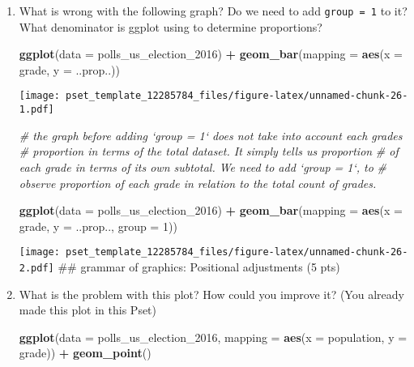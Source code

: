 \documentclass[
]{article}
\newenvironment{Shaded}{\begin{snugshade}}{\end{snugshade}}
\newcommand{\CommentTok}[1]{\textcolor[rgb]{0.56,0.35,0.01}{\textit{#1}}}
\newcommand{\DataTypeTok}[1]{\textcolor[rgb]{0.13,0.29,0.53}{#1}}
\newcommand{\DecValTok}[1]{\textcolor[rgb]{0.00,0.00,0.81}{#1}}
\newcommand{\KeywordTok}[1]{\textcolor[rgb]{0.13,0.29,0.53}{\textbf{#1}}}
\newcommand{\NormalTok}[1]{#1}
\newcommand{\OperatorTok}[1]{\textcolor[rgb]{0.81,0.36,0.00}{\textbf{#1}}}
\newcommand{\StringTok}[1]{\textcolor[rgb]{0.31,0.60,0.02}{#1}}
\begin{document}
\begin{enumerate}
\def\labelenumi{\arabic{enumi}.}
\item
  What is wrong with the following graph? Do we need to add
  \texttt{group\ =\ 1} to it? What denominator is ggplot using to
  determine proportions?

\begin{Shaded}
\begin{Highlighting}[]
\KeywordTok{ggplot}\NormalTok{(}\DataTypeTok{data =}\NormalTok{ polls_us_election_}\DecValTok{2016}\NormalTok{) }\OperatorTok{+}\StringTok{ }
\StringTok{  }\KeywordTok{geom_bar}\NormalTok{(}\DataTypeTok{mapping =} \KeywordTok{aes}\NormalTok{(}\DataTypeTok{x =}\NormalTok{ grade, }\DataTypeTok{y =}\NormalTok{ ..prop..))}
\end{Highlighting}
\end{Shaded}

  \texttt{[image: pset\_template\_12285784\_files/figure-latex/unnamed-chunk-26-1.pdf]}

\begin{Shaded}
\begin{Highlighting}[]
\CommentTok{# the graph before adding `group = 1` does not take into account each grades}
\CommentTok{# proportion in terms of the total dataset. It simply tells us proportion}
\CommentTok{# of each grade in terms of its own subtotal. We need to add `group = 1`, to}
\CommentTok{# observe proportion of each grade in relation to the total count of grades.}

\KeywordTok{ggplot}\NormalTok{(}\DataTypeTok{data =}\NormalTok{ polls_us_election_}\DecValTok{2016}\NormalTok{) }\OperatorTok{+}\StringTok{ }
\StringTok{  }\KeywordTok{geom_bar}\NormalTok{(}\DataTypeTok{mapping =} \KeywordTok{aes}\NormalTok{(}\DataTypeTok{x =}\NormalTok{ grade, }\DataTypeTok{y =}\NormalTok{ ..prop.., }\DataTypeTok{group =} \DecValTok{1}\NormalTok{))}
\end{Highlighting}
\end{Shaded}

  \texttt{[image: pset\_template\_12285784\_files/figure-latex/unnamed-chunk-26-2.pdf]}
  \#\# grammar of graphics: Positional adjustments (5 pts)
\item
  What is the problem with this plot? How could you improve it? (You
  already made this plot in this Pset)

\begin{Shaded}
\begin{Highlighting}[]
\KeywordTok{ggplot}\NormalTok{(}\DataTypeTok{data =}\NormalTok{ polls_us_election_}\DecValTok{2016}\NormalTok{, }
       \DataTypeTok{mapping =} \KeywordTok{aes}\NormalTok{(}\DataTypeTok{x =}\NormalTok{ population, }\DataTypeTok{y =}\NormalTok{ grade)) }\OperatorTok{+}\StringTok{ }
\StringTok{  }\KeywordTok{geom_point}\NormalTok{()}
\end{Highlighting}
\end{Shaded}


\end{enumerate}
\end{document}
